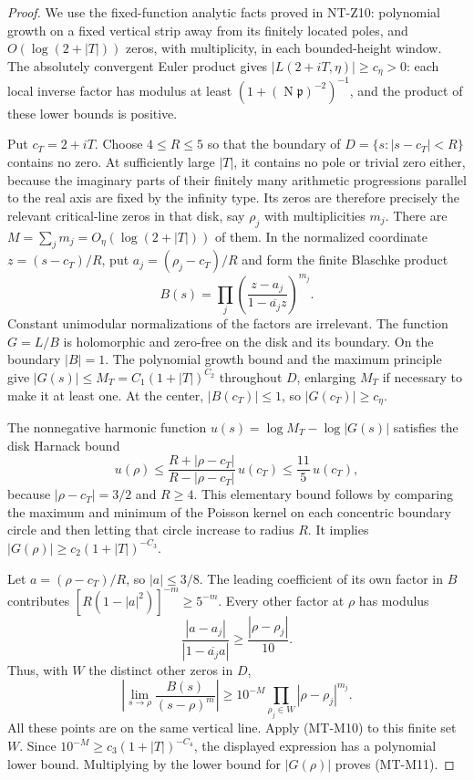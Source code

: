\begin{proof}
We use the fixed-function analytic facts proved in NT-Z10:
polynomial growth on a fixed vertical strip away from its
finitely located poles, and $O(\log(2+|T|))$ zeros, with
multiplicity, in each bounded-height window.
The absolutely convergent Euler product gives
$|L(2+iT,\eta)|\ge c_\eta>0$: each local inverse factor
has modulus at least $(1+(\operatorname N\mathfrak p)^{-2})^{-1}$,
and the product of these lower bounds is positive.

Put $c_T=2+iT$. Choose $4\le R\le5$ so that the boundary of
$D=\{s:|s-c_T|<R\}$ contains no zero. At sufficiently large
$|T|$, it contains no pole or trivial zero either, because
the imaginary parts of their finitely many arithmetic
progressions parallel to the real axis are fixed by the infinity type.
Its zeros are therefore precisely the relevant critical-line
zeros in that disk, say $\rho_j$ with multiplicities $m_j$.
There are
$M=\sum_jm_j=O_\eta(\log(2+|T|))$ of them.
In the normalized coordinate $z=(s-c_T)/R$, put
$a_j=(\rho_j-c_T)/R$ and form the finite Blaschke product
\[
 B(s)=\prod_j
       \left(\frac{z-a_j}{1-\overline{a_j}z}\right)^{m_j}.
\]
Constant unimodular normalizations of the factors are
irrelevant. The function $G=L/B$ is holomorphic and zero-free
on the disk and its boundary. On the boundary $|B|=1$.
The polynomial growth bound and the maximum principle give
$|G(s)|\le M_T=C_1(1+|T|)^{C_2}$ throughout $D$, enlarging
$M_T$ if necessary to make it at least one.
At the center, $|B(c_T)|\le1$, so
$|G(c_T)|\ge c_\eta$.

The nonnegative harmonic function
$u(s)=\log M_T-\log|G(s)|$ satisfies the disk Harnack bound
\[
 u(\rho)\le
 \frac{R+|\rho-c_T|}{R-|\rho-c_T|}\,u(c_T)
 \le\frac{11}{5}\,u(c_T),
\]
because $|\rho-c_T|=3/2$ and $R\ge4$.
This elementary bound follows by comparing the maximum and
minimum of the Poisson kernel on each concentric boundary
circle and then letting that circle increase to radius $R$.
It implies $|G(\rho)|\ge c_2(1+|T|)^{-C_3}$.

Let $a=(\rho-c_T)/R$, so $|a|\le3/8$.
The leading coefficient of its own factor in $B$ contributes
$[R(1-|a|^2)]^{-m}\ge5^{-m}$.
Every other factor at $\rho$ has modulus
\[
 \frac{|a-a_j|}{|1-\overline{a_j}a|}
 \ge\frac{|\rho-\rho_j|}{10}.
\]
Thus, with $W$ the distinct other zeros in $D$,
\[
 \left|\lim_{s\to\rho}\frac{B(s)}{(s-\rho)^m}\right|
 \ge 10^{-M}\prod_{\rho_j\in W}|\rho-\rho_j|^{m_j}.
\]
All these points are on the same vertical line. Apply
(MT-M10) to this finite set $W$. Since
$10^{-M}\ge c_3(1+|T|)^{-C_4}$, the displayed expression
has a polynomial lower bound. Multiplying by the lower bound
for $|G(\rho)|$ proves (MT-M11).
\end{proof}


